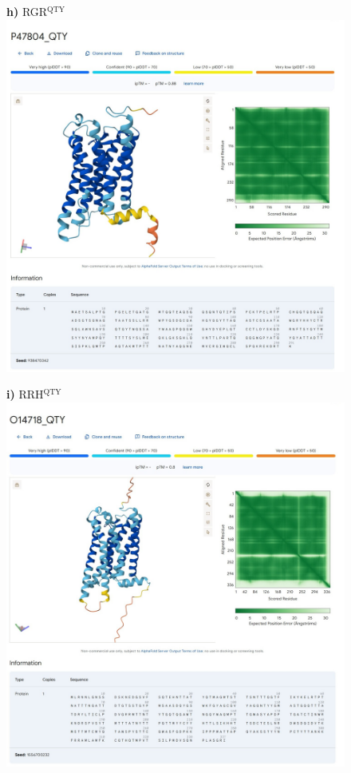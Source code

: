 \documentclass[fleqn,12pt]{supp}
\begin{document}
\newpage
\begin{figure}[H]
    \textbf{h)} RGR$^{\textrm{QTY}}$ \\
    \includegraphics[width=\linewidth]{SuppFigures/af3 rgr qty.jpg}
\end{figure}

\newpage
\begin{figure}[H]
    \textbf{i)} RRH$^{\textrm{QTY}}$ \\
    \includegraphics[width=\linewidth]{SuppFigures/af3 rrh qty.jpg}
\end{figure}
\end{document}
